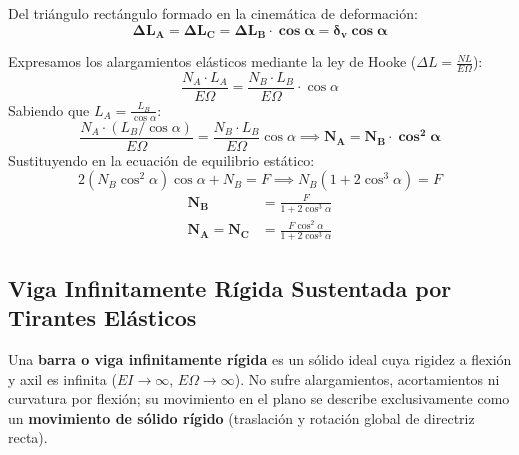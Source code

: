 {    Del triángulo rectángulo formado en la cinemática de deformación:
    \begin{equation}
        \mathbf{\Delta L_A = \Delta L_C = \Delta L_B \cdot \cos \alpha = \delta_v \cos \alpha}
        \label{eq:cinematica_3tirantes}
    \end{equation}


    Expresamos los alargamientos elásticos mediante la ley de Hooke ($\Delta L = \frac{N L}{E \Omega}$):
    \begin{equation}
        \frac{N_A \cdot L_A}{E \Omega} = \frac{N_B \cdot L_B}{E \Omega} \cdot \cos \alpha
    \end{equation}
    Sabiendo que $L_A = \frac{L_B}{\cos \alpha}$:
    \begin{equation}
        \frac{N_A \cdot (L_B / \cos \alpha)}{E \Omega} = \frac{N_B \cdot L_B}{E \Omega} \cos \alpha \implies \mathbf{N_A = N_B \cdot \cos^2 \alpha}
    \end{equation}
    Sustituyendo en la ecuación de equilibrio estático:
    \begin{equation}
        2 (N_B \cos^2 \alpha) \cos \alpha + N_B = F \implies N_B \left( 1 + 2 \cos^3 \alpha \right) = F
    \end{equation}
    \begin{align}
        \mathbf{N_B}       & = \frac{F}{1 + 2 \cos^3 \alpha}               \\
        \mathbf{N_A = N_C} & = \frac{F \cos^2 \alpha}{1 + 2 \cos^3 \alpha}
    \end{align}
}

\subsection{Viga Infinitamente Rígida Sustentada por Tirantes Elásticos}

Una \textbf{barra o viga infinitamente rígida} es un sólido ideal cuya rigidez a flexión y axil es infinita ($EI \to \infty$, $E\Omega \to \infty$). No sufre alargamientos, acortamientos ni curvatura por flexión; su movimiento en el plano se describe exclusivamente como un \textbf{movimiento de sólido rígido} (traslación y rotación global de directriz recta).

